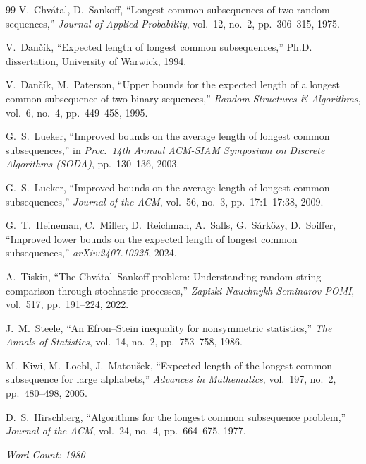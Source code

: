 \documentclass[12pt,a4paper]{article}
\begin{document}
\begin{thebibliography}{99}
V.~Chv\'{a}tal, D.~Sankoff,
``Longest common subsequences of two random sequences,''
\textit{Journal of Applied Probability}, vol.~12, no.~2, pp.~306--315, 1975.

V.~Dan\v{c}\'{i}k,
``Expected length of longest common subsequences,''
Ph.D. dissertation, University of Warwick, 1994.

V.~Dan\v{c}\'{i}k, M.~Paterson,
``Upper bounds for the expected length of a longest common subsequence of two binary sequences,''
\textit{Random Structures \& Algorithms}, vol.~6, no.~4, pp.~449--458, 1995.

G.~S.~Lueker,
``Improved bounds on the average length of longest common subsequences,''
in \textit{Proc.~14th Annual ACM-SIAM Symposium on Discrete Algorithms (SODA)}, pp.~130--136, 2003.

G.~S.~Lueker,
``Improved bounds on the average length of longest common subsequences,''
\textit{Journal of the ACM}, vol.~56, no.~3, pp.~17:1--17:38, 2009.

G.~T.~Heineman, C.~Miller, D.~Reichman, A.~Salls, G.~S\'{a}rk\"{o}zy, D.~Soiffer,
``Improved lower bounds on the expected length of longest common subsequences,''
\textit{arXiv:2407.10925}, 2024.

A.~Tiskin,
``The Chv\'{a}tal--Sankoff problem: Understanding random string comparison through stochastic processes,''
\textit{Zapiski Nauchnykh Seminarov POMI}, vol.~517, pp.~191--224, 2022.

J.~M.~Steele,
``An {E}fron--{S}tein inequality for nonsymmetric statistics,''
\textit{The Annals of Statistics}, vol.~14, no.~2, pp.~753--758, 1986.

M.~Kiwi, M.~Loebl, J.~Matou\v{s}ek,
``Expected length of the longest common subsequence for large alphabets,''
\textit{Advances in Mathematics}, vol.~197, no.~2, pp.~480--498, 2005.

D.~S.~Hirschberg,
``Algorithms for the longest common subsequence problem,''
\textit{Journal of the ACM}, vol.~24, no.~4, pp.~664--675, 1977.
\end{thebibliography}

\bigskip
\noindent\textit{Word Count: 1980}
\end{document}
